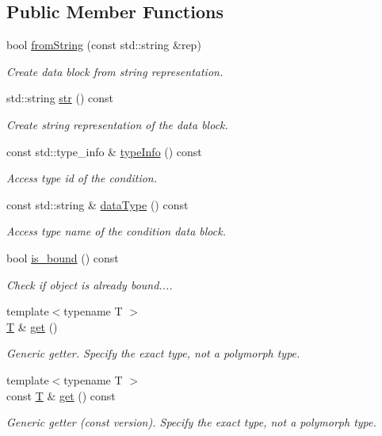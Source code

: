 \subsection*{Public Member Functions}
\begin{DoxyCompactItemize}
\item 
bool \hyperlink{class_d_d4hep_1_1_opaque_data_a16fd37f0268885057b59d475031993c4}{from\+String} (const std\+::string \&rep)
\begin{DoxyCompactList}\small\item\em Create data block from string representation. \end{DoxyCompactList}\item 
std\+::string \hyperlink{class_d_d4hep_1_1_opaque_data_a96ef1102e86ea3ef3b2494c1686c300a}{str} () const
\begin{DoxyCompactList}\small\item\em Create string representation of the data block. \end{DoxyCompactList}\item 
const std\+::type\+\_\+info \& \hyperlink{class_d_d4hep_1_1_opaque_data_af2e5807d6c75103481dc89ee7152faa3}{type\+Info} () const
\begin{DoxyCompactList}\small\item\em Access type id of the condition. \end{DoxyCompactList}\item 
const std\+::string \& \hyperlink{class_d_d4hep_1_1_opaque_data_a89ff4579a7f7912ee3fc8087a47e2411}{data\+Type} () const
\begin{DoxyCompactList}\small\item\em Access type name of the condition data block. \end{DoxyCompactList}\item 
bool \hyperlink{class_d_d4hep_1_1_opaque_data_acfbe1d3b81ce00f26851bd972a1daca7}{is\+\_\+bound} () const
\begin{DoxyCompactList}\small\item\em Check if object is already bound.... \end{DoxyCompactList}\item 
{\footnotesize template$<$typename T $>$ }\\\hyperlink{class_t}{T} \& \hyperlink{class_d_d4hep_1_1_opaque_data_aae8619e3b068708a4d4d0ffa09cdd22b}{get} ()
\begin{DoxyCompactList}\small\item\em Generic getter. Specify the exact type, not a polymorph type. \end{DoxyCompactList}\item 
{\footnotesize template$<$typename T $>$ }\\const \hyperlink{class_t}{T} \& \hyperlink{class_d_d4hep_1_1_opaque_data_a889d6d26bf44ed29ea08d084d8cf7d24}{get} () const
\begin{DoxyCompactList}\small\item\em Generic getter (const version). Specify the exact type, not a polymorph type. \end{DoxyCompactList}\end{DoxyCompactItemize}
